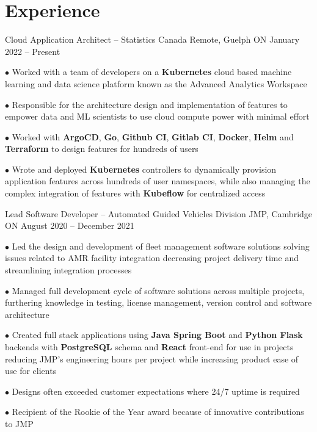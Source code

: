 \documentclass[a4paper,11pt]{article}
\newcommand{\sectionsep}{\vspace{-2.5mm}}
\begin{document}
\sectionsep
\section{Experience}
\resumeSubHeadingListStart

\resumeExp
{Cloud Application Architect -- Statistics Canada}
{Remote, Guelph ON}
{January 2022 -- Present}
{}
\resumeItemListStart
\item[$\bullet$] Worked with a team of developers on a \textbf{Kubernetes} cloud based machine learning and data science
platform known as the Advanced Analytics Workspace
\href{https://analytics-platform.statcan.gc.ca/covid19}{\footnotesize{\faExternalLink}}
\item[$\bullet$] Responsible for the architecture design and implementation of features to  empower data and ML scientists to
use cloud compute power with  minimal effort
\item[$\bullet$] Worked with \textbf{ArgoCD}, \textbf{Go}, \textbf{Github CI}, \textbf{Gitlab CI}, \textbf{Docker}, \textbf{Helm} and
\textbf{Terraform} to design features for hundreds of users
\item[$\bullet$] Wrote and deployed \textbf{Kubernetes} controllers to dynamically provision application
features across hundreds of user namespaces, while
also managing the complex integration of features with \textbf{Kubeflow} for centralized access
\resumeItemListEnd

\resumeExp
{Lead Software Developer -- Automated Guided Vehicles Division}
{JMP, Cambridge ON}
{August 2020 -- December 2021}
{}
\resumeItemListStart
\item[$\bullet$] Led the design and development of fleet management software solutions solving issues related to
AMR facility integration decreasing project delivery time and streamlining integration processes
\item[$\bullet$]  Managed full development cycle of software solutions across multiple projects, furthering
knowledge in testing, license management, version control and software architecture
\item[$\bullet$] Created full stack applications using \textbf{Java Spring Boot} and \textbf{Python Flask} backends with
\textbf{PostgreSQL} schema and \textbf{React} front-end for use in projects reducing JMP's engineering hours
per project while increasing product ease of use for clients
\item[$\bullet$] Designs often exceeded customer expectations where 24/7 uptime is required
\item[$\bullet$] Recipient of the Rookie of the Year award because of innovative contributions to JMP
\resumeItemListEnd
\end{document}
